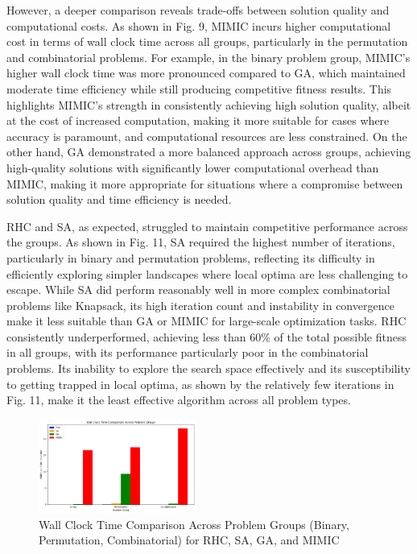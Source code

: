 However, a deeper comparison reveals trade-offs between solution quality and computational costs. As shown in Fig. 9, MIMIC incurs higher computational cost in terms of wall clock time across all groups, particularly in the permutation and combinatorial problems. For example, in the binary problem group, MIMIC's higher wall clock time was more pronounced compared to GA, which maintained moderate time efficiency while still producing competitive fitness results. This highlights MIMIC’s strength in consistently achieving high solution quality, albeit at the cost of increased computation, making it more suitable for cases where accuracy is paramount, and computational resources are less constrained. On the other hand, GA demonstrated a more balanced approach across groups, achieving high-quality solutions with significantly lower computational overhead than MIMIC, making it more appropriate for situations where a compromise between solution quality and time efficiency is needed.

RHC and SA, as expected, struggled to maintain competitive performance across the groups. As shown in Fig. 11, SA required the highest number of iterations, particularly in binary and permutation problems, reflecting its difficulty in efficiently exploring simpler landscapes where local optima are less challenging to escape. While SA did perform reasonably well in more complex combinatorial problems like Knapsack, its high iteration count and instability in convergence make it less suitable than GA or MIMIC for large-scale optimization tasks. RHC consistently underperformed, achieving less than 60\% of the total possible fitness in all groups, with its performance particularly poor in the combinatorial problems. Its inability to explore the search space effectively and its susceptibility to getting trapped in local optima, as shown by the relatively few iterations in Fig. 11, make it the least effective algorithm across all problem types.
\begin{figure}[h!]
    \centering
    \includegraphics[width=0.46\textwidth]{image/timeplot.png}
    \caption{Wall Clock Time Comparison Across Problem Groups (Binary, Permutation, Combinatorial) for RHC, SA, GA, and MIMIC}
    \label{fig:wall_clock_time_comparison}
\end{figure}

